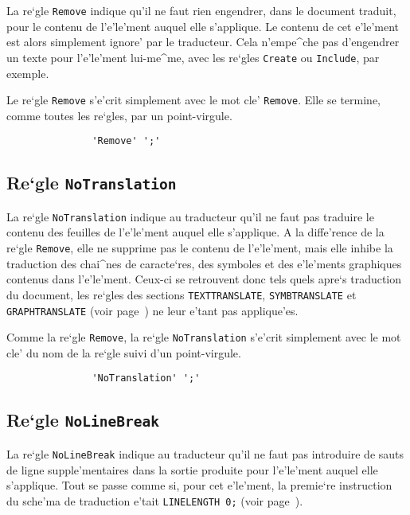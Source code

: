 {La re`gle {\tt Remove} indique qu'il ne faut rien engendrer, dans le document
traduit, pour le contenu de l'e'le'ment auquel elle s'applique. Le contenu de
cet e'le'ment est alors simplement ignore' par le traducteur. Cela n'empe^che
pas d'engendrer un texte pour l'e'le'ment lui-me^me, avec les re`gles
{\tt Create} ou {\tt Include}, par exemple.

Le re`gle {\tt Remove} s'e'crit simplement avec le mot cle' {\tt Remove}. Elle
se termine, comme toutes les re`gles, par un point-virgule.

\begin{verbatim}
               'Remove' ';'
\end{verbatim}

\subsection{Re`gle {\tt NoTranslation}}
\label{notrans}

La re`gle {\tt NoTranslation} indique au traducteur qu'il ne faut pas traduire
le contenu des feuilles de l'e'le'ment auquel elle s'applique. A la
diffe'rence de la re`gle {\tt Remove}, elle ne supprime pas le contenu de
l'e'le'ment, mais elle inhibe la traduction des chai^nes de caracte`res, des
symboles et des e'le'ments graphiques contenus dans l'e'le'ment. Ceux-ci se
retrouvent donc tels quels apre`s traduction du document, les re`gles des
sections {\tt TEXTTRANSLATE}, {\tt SYMBTRANSLATE} et {\tt GRAPHTRANSLATE}
(voir page~\pageref{texttrans}) ne leur e'tant pas applique'es.

Comme la re`gle {\tt Remove}, la re`gle {\tt NoTranslation} s'e'crit
simplement avec le mot cle' du nom de la re`gle suivi d'un point-virgule.

\begin{verbatim}
               'NoTranslation' ';'
\end{verbatim}

\subsection{Re`gle {\tt NoLineBreak}}
\label{nolinebreak}

La re`gle {\tt NoLineBreak} indique au traducteur qu'il ne faut pas introduire
de sauts de ligne supple'mentaires dans la sortie produite pour l'e'le'ment
auquel elle s'applique. Tout se passe comme si, pour cet e'le'ment, la
premie`re instruction du sche'ma de traduction e'tait {\tt LINELENGTH 0;}
(voir page~\pageref{longueurligne}).

}
